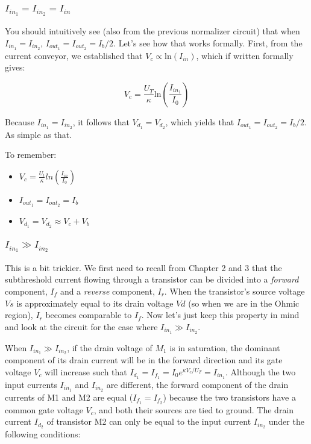 \subsubsection{$I_{in_1} = I_{in_2} = I_{in}$}

You should intuitively see (also from the previous normalizer circuit) that when $I_{in_1} = I_{in_2}$, $I_{out_1} = I_{out_2} = I_b/2$. Let's see how that works formally. First, from the current conveyor, we established that $V_c \propto \mathrm{ln}(I_{in})$, which if written formally gives: 

\begin{equation}
    V_c = \frac{U_T}{\kappa}\mathrm{ln}(\frac{I_{in_1}}{I_0})
\end{equation}

Because $I_{in_1} = I_{in_2}$, it follows that $V_{d_1} = V_{d_2}$, which yields that $I_{out_1} = I_{out_2} = I_b/2$. As simple as that. 


To remember: 

\begin{itemize}
    \item $V_c = \frac{U_t}{\kappa}ln(\frac{I_{in}}{I_0})$
    \item $I_{out_1} = I_{out_2} = I_b$
    \item $V_{d_1} = V_{d_2} \approx V_c + V_b$
\end{itemize}


\subsubsection{$I_{in_1} \gg I_{in_2}$}

This is a bit trickier. We first need to recall from Chapter 2 and 3 that the subthreshold current flowing through a transistor can be divided into a \textit{forward} component, $I_f$ and a \textit{reverse} component, $I_r$. When the transistor’s source voltage $Vs$ is approximately equal to its drain voltage $Vd$ (so when we are in the Ohmic region), $I_r$ becomes comparable to $I_f$. Now let's just keep this property in mind and look at the circuit for the case where $I_{in_1} \gg I_{in_2}$.

When $I_{in_1} \gg I_{in_2}$, if the drain voltage of $M_1$ is in saturation, the dominant component of its drain current will be in the forward direction and its gate voltage $V_c$ will increase such that $I_{d_1} = I_{f_1} = I_0e^{\kappa V_c/U_T} = I_{in_1}$.  Although the two input currents $I_{in_1}$ and $I_{in_2}$ are different, the forward component of the drain currents of M1 and M2 are equal ($I_{f_1}= I_{f_2}$) because the two transistors
have a common gate voltage $V_c$, and both their sources are tied to ground. The drain current $I_{d_2}$ of transistor M2 can only be equal to the input current $I_{in_2}$ under the following conditions:

